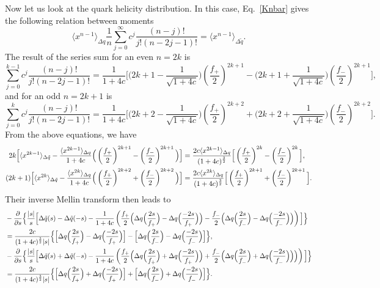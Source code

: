 Now let us look at the quark helicity distribution. In this case, Eq.~\ref{Knbar} gives the following relation between moments
%
\begin{equation}
\langle x^{n-1}\rangle_{\Delta q} \frac{1}{n}\sum_{j=0}^{\infty}c^j\frac{(n-j)!}{j!(n-2j-1)!}=\langle x^{n-1}\rangle_{\Delta \tilde q} .
\end{equation}
% 
The result of the series sum for an even $n=2k$ is
%
\begin{equation}
\sum_{j=0}^{k-1}c^j\frac{(n-j)!}{j!(n-2j-1)!}=\frac{1}{1+4c}\Big[\Big(2k+1 -\frac{1}{\sqrt{1+4c}}\Big)\left(\frac{f_+}{2}\right)^{2k+1}-\Big(2k+1 +\frac{1}{\sqrt{1+4c}}\Big)\left(\frac{f_-}{2}\right)^{2k+1}\Big],
\end{equation}
%
and for an odd $n=2k+1$ is
%
\begin{equation}
\sum_{j=0}^{k}c^j\frac{(n-j)!}{j!(n-2j-1)!}=\frac{1}{1+4c}\Big[\Big(2k+2 -\frac{1}{\sqrt{1+4c}}\Big)\left(\frac{f_+}{2}\right)^{2k+2}+\Big(2k+2 +\frac{1}{\sqrt{1+4c}}\Big)\left(\frac{f_-}{2}\right)^{2k+2}\Big].
\end{equation}
%
From the above equations, we have
%
\begin{align}
2k \Big[\langle x^{2k-1}\rangle_{\Delta \tilde q}-\frac{\langle x^{2k-1}\rangle_{\Delta q}}{1+4c}\Big(\left(\frac{f_+}{2}\right)^{2k+1}-\left(\frac{f_-}{2}\right)^{2k+1}\Big)\Big]&=\frac{2c \langle x^{2k-1}\rangle_{\Delta q}}{(1+4c)^\frac{3}{2}}\Big[\left(\frac{f_+}{2}\right)^{2k}-\left(\frac{f_-}{2}\right)^{2k}\Big], \nonumber\\
(2k+1) \Big[\langle x^{2k}\rangle_{\Delta \tilde q}-\frac{\langle x^{2k}\rangle_{\Delta q}}{1+4c}\Big(\left(\frac{f_+}{2}\right)^{2k+2}+\left(\frac{f_-}{2}\right)^{2k+2}\Big)\Big]&=\frac{2c \langle x^{2k}\rangle_{\Delta q}}{(1+4c)^\frac{3}{2}}\Big[\left(\frac{f_+}{2}\right)^{2k+1}+\left(\frac{f_-}{2}\right)^{2k+1}\Big].
\end{align}
%
Their inverse Mellin transform then leads to
%
\begin{align}
&-\frac{\partial}{\partial s}\Big\{\frac{|s|}{s}\Big[\Delta\tilde q(s)-\Delta\tilde q(-s)-\frac{1}{1+4c}\left(\frac{f_+}{2}\Big(\Delta q\Big(\frac{2s}{f_+}\Big)-\Delta q\Big(\frac{-2s}{f_+}\Big)\Big)-\frac{f_-}{2}\Big(\Delta q\Big(\frac{2s}{f_-}\Big)-\Delta q\Big(\frac{-2s}{f_-}\Big)\Big)\right)\Big]\Big\}\nonumber\\
&=\frac{2c}{(1+4c)^{\frac{3}{2}}|s|}\Big\{\Big[\Delta q\Big(\frac{2s}{f_+}\Big)-\Delta q\Big(\frac{-2s}{f_+}\Big)\Big]-\Big[\Delta q\Big(\frac{2s}{f_-}\Big)-\Delta q\Big(\frac{-2s}{f_-}\Big)\Big]\Big\},\nonumber\\
&-\frac{\partial}{\partial s}\Big\{\frac{|s|}{s}\Big[\Delta \tilde q(s)+\Delta \tilde q(-s)-\frac{1}{1+4c}\left(\frac{f_+}{2}\Big(\Delta q\Big(\frac{2s}{f_+}\Big)+\Delta q\Big(\frac{-2s}{f_+}\Big)\Big)+\frac{f_-}{2}\Big(\Delta q\Big(\frac{2s}{f_-}\Big)+\Delta q\Big(\frac{-2s}{f_-}\Big)\Big)\Big)\right)\Big]\Big\}\nonumber\\
&=\frac{2c}{(1+4c)^{\frac{3}{2}}|s|}\Big\{\Big[\Delta q\Big(\frac{2s}{f_+}\Big)+\Delta q\Big(\frac{-2s}{f_+}\Big)\Big]+\Big[\Delta q\Big(\frac{2s}{f_-}\Big)+\Delta q\Big(\frac{-2s}{f_-}\Big)\Big]\Big\}.
\end{align}
